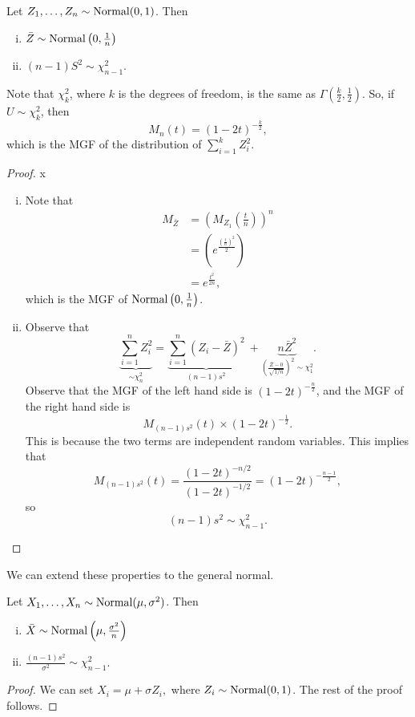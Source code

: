 \begin{prop}
Let $Z_1,\dots,Z_n\sim \operatorname*{Normal}(0,1)$. Then
\begin{enumerate}[(i)]
    \item $\bar Z\sim\operatorname*{Normal}\left(0,\frac{1}{n}\right)$
    \item $(n-1)S^2\sim\chi^2_{n-1}$.
\end{enumerate}
\end{prop}

\begin{remark}
		Note that $\chi^2_k$, where $k$ is the degrees of freedom, is the same as $\Gamma\left(\frac{k}{2},\frac{1}{2}\right)$. So, if $U\sim \chi^2_k$, then $$M_n(t)=(1-2t)^{-\frac{k}{2}},$$ which is the MGF of the distribution of $\sum^k_{i=1}Z_i^2.$
\end{remark}

\begin{proof}
\phantom x
\begin{enumerate}[(i)]
    \item Note that
\begin{align*}
		M_{\bar Z}&=\left(M_{Z_1}\left(\frac{t}{n}\right)\right)^n \\
				  &= \left(e^{\frac{\left(\frac{t}{n}\right)^2}{2}}\right) \\
				  &= e^{\frac{t^2}{2n}},
\end{align*}
which is the MGF of $\operatorname*{Normal}\left( 0,\frac{1}{n} \right)$.

    \item Observe that
			$$\underbrace{\sum^n_{i=1}Z_i^2}_{\sim\chi^2_n}=\underbrace{\sum^n_{i=1}(Z_i-\bar Z)^2}_{(n-1)s^2} \ +\underbrace{n\bar Z^2}_{\left(\frac{\bar Z-0}{\sqrt{1/n}}\right)^2\sim\chi^2_1}.$$
   	Observe that the MGF of the left hand side is 
	$(1-2t)^{-\frac{n}{2}}$, and the MGF of the right hand side is 
	$$M_{(n-1)s^2}(t)\times(1-2t)^{-\frac{1}{2}}.$$ 
	This is because the two terms are independent random variables. This implies that
    $$M_{(n-1)s^2}(t)=\frac{(1-2t)^{-n/2}}{(1-2t)^{-1/2}}=(1-2t)^{-\frac{n-1}{2}},$$ 
	so
    $$
    (n-1)s^2\sim\chi^2_{n-1}.
    $$
\end{enumerate}
\end{proof}
We can extend these properties to the general normal.
\begin{prop}
	 Let $X_1,\dots,X_n\sim \operatorname*{Normal}(\mu,\sigma^2)$. Then
    \begin{enumerate}[(i)]
        \item $\bar X \sim
        \operatorname*{Normal}\left(\mu,\frac{\sigma^2}{n}\right)$
        \item $\frac{(n-1)s^2}{\sigma^2}\sim \chi^2_{n-1}$.
    \end{enumerate}
\end{prop}
\begin{proof}
		We can set $X_i=\mu+\sigma Z_i,$ where $Z_i\sim \operatorname*{Normal}(0,1)$. The rest of the proof follows. 
\end{proof}   
